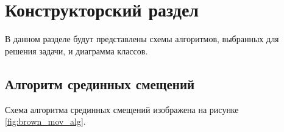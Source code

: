 \chapter{Конструкторский раздел}
\label{cha:design}

В данном разделе будут представлены схемы алгоритмов, выбранных для решения задачи, и диаграмма классов.

\section{Алгоритм срединных смещений}

Схема алгоритма срединных смещений изображена на рисунке \ref{fig:brown_mov_alg}.

\begin{figure}[ph!]

\end{figure}
